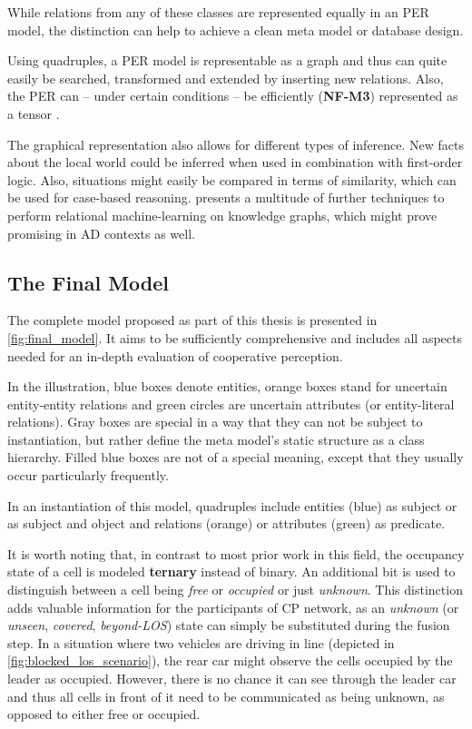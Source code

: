 While relations from any of these classes are represented equally in an PER model, the distinction can help to achieve a clean meta model or database design.
\par
\bigskip

Using quadruples, a PER model is representable as a graph and thus can quite easily be searched, transformed and extended by inserting new relations. Also, the PER can – under certain conditions – be efficiently (\textbf{NF-M3}) represented as a tensor \cite{Petrich2018}.

The graphical representation also allows for different types of inference. New facts about the local world could be inferred when used in combination with first-order logic. Also, situations might easily be compared in terms of similarity, which can be used for case-based reasoning. \cite{Nickel2016} presents a multitude of further techniques to perform relational machine-learning on knowledge graphs, which might prove promising in AD contexts as well. 

\subsection{The Final Model}
\label{subsec:concept_design:the_final_model}
The complete model proposed as part of this thesis is presented in \cref{fig:final_model}. It aims to be sufficiently comprehensive and includes all aspects needed for an in-depth evaluation of cooperative perception. 

In the illustration, blue boxes denote entities, orange boxes stand for uncertain entity-entity relations and green circles are uncertain attributes (or entity-literal relations). Gray boxes are special in a way that they can not be subject to instantiation, but rather define the meta model's static structure as a class hierarchy. Filled blue boxes are not of a special meaning, except that they usually occur particularly frequently.

In an instantiation of this model, quadruples include entities (blue) as subject or as subject and object and relations (orange) or attributes (green) as predicate. 

It is worth noting that, in contrast to most prior work in this field, the occupancy state of a cell is modeled \textbf{ternary} instead of binary. An additional bit is used to distinguish between a cell being \textit{free} or \textit{occupied} or just \textit{unknown}. This distinction adds valuable information for the participants of CP network, as an  \textit{unknown} (or \textit{unseen}, \textit{covered}, \textit{beyond-LOS}) state can simply be substituted during the fusion step. In a situation where two vehicles are driving in line (depicted in \cref{fig:blocked_los_scenario}), the rear car might observe the cells occupied by the leader as occupied. However, there is no chance it can see through the leader car and thus all cells in front of it need to be communicated as being unknown, as opposed to either free or occupied.

